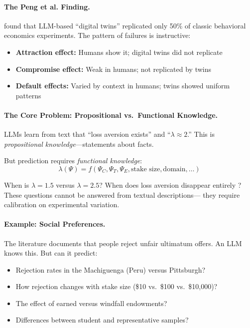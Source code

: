 \paragraph{The Peng et al. Finding.}
\citet{peng2025} found that LLM-based ``digital twins'' replicated only 50\% of
classic behavioral economics experiments. The pattern of failures is instructive:
\begin{itemize}
    \item \textbf{Attraction effect:} Humans show it; digital twins did not replicate
    \item \textbf{Compromise effect:} Weak in humans; not replicated by twins
    \item \textbf{Default effects:} Varied by context in humans; twins showed uniform patterns
\end{itemize}

\paragraph{The Core Problem: Propositional vs.\ Functional Knowledge.}
LLMs learn from text that ``loss aversion exists'' and ``$\lambda \approx 2$.''
This is \emph{propositional knowledge}---statements about facts.

But prediction requires \emph{functional knowledge}:
\begin{equation}
    \lambda(\Psi) = f(\Psi_C, \Psi_T, \Psi_E, \text{stake size}, \text{domain}, \ldots)
\end{equation}

When is $\lambda = 1.5$ versus $\lambda = 2.5$? When does loss aversion disappear entirely
\citep{list2003}? These questions cannot be answered from textual descriptions---
they require calibration on experimental variation.

\paragraph{Example: Social Preferences.}
The literature documents that people reject unfair ultimatum offers.
An LLM knows this. But can it predict:
\begin{itemize}
    \item Rejection rates in the Machiguenga (Peru) versus Pittsburgh?
    \item How rejection changes with stake size (\$10 vs.\ \$100 vs.\ \$10,000)?
    \item The effect of earned versus windfall endowments?
    \item Differences between student and representative samples?
\end{itemize}

